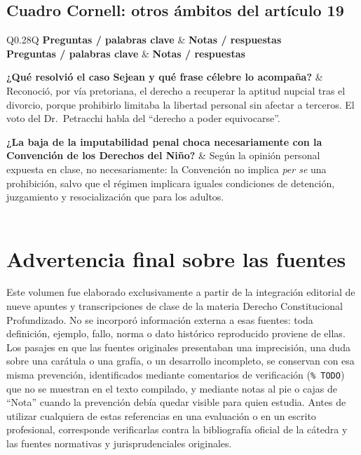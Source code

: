 \documentclass[12pt,oneside]{book}
\newcommand{\materia}{Derecho Constitucional Profundizado}
\newcommand{\cornellhead}{%
    \toprule
    \textbf{Preguntas / palabras clave} & \textbf{Notas / respuestas} \\
    \midrule}
\newcommand{\cornellsep}{\\ \addlinespace \cmidrule[0.2pt]{1-2} \addlinespace}
\begin{document}
\section{Cuadro Cornell: otros ámbitos del artículo 19}

\begin{longtable}{Q{0.28\textwidth}Q{\textwidth\relax}}
\cornellhead
\endfirsthead
\cornellhead
\endhead

\textbf{¿Qué resolvió el caso Sejean y qué frase célebre lo acompaña?} &
Reconoció, por vía pretoriana, el derecho a recuperar la aptitud nupcial tras el divorcio, porque prohibirlo limitaba la libertad personal sin afectar a terceros. El voto del Dr.\ Petracchi habla del ``derecho a poder equivocarse''.
\cornellsep

\textbf{¿La baja de la imputabilidad penal choca necesariamente con la Convención de los Derechos del Niño?} &
Según la opinión personal expuesta en clase, no necesariamente: la Convención no implica \emph{per se} una prohibición, salvo que el régimen implicara iguales condiciones de detención, juzgamiento y resocialización que para los adultos.
\\
\midrule
{} \\
\end{longtable}

\backmatter

\chapter*{Advertencia final sobre las fuentes}

Este volumen fue elaborado exclusivamente a partir de la integración editorial de nueve apuntes y transcripciones de clase de la materia \materia. No se incorporó información externa a esas fuentes: toda definición, ejemplo, fallo, norma o dato histórico reproducido proviene de ellas. Los pasajes en que las fuentes originales presentaban una imprecisión, una duda sobre una carátula o una grafía, o un desarrollo incompleto, se conservan con esa misma prevención, identificados mediante comentarios de verificación (\texttt{\% TODO}) que no se muestran en el texto compilado, y mediante notas al pie o cajas de ``Nota'' cuando la prevención debía quedar visible para quien estudia. Antes de utilizar cualquiera de estas referencias en una evaluación o en un escrito profesional, corresponde verificarlas contra la bibliografía oficial de la cátedra y las fuentes normativas y jurisprudenciales originales.
\end{document}
